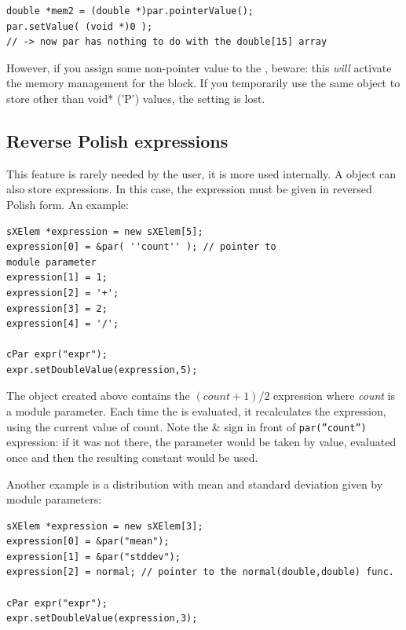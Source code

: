 \begin{verbatim}
double *mem2 = (double *)par.pointerValue();
par.setValue( (void *)0 );
// -> now par has nothing to do with the double[15] array
\end{verbatim}



However, if you assign some non-pointer value
to the , beware: this \textit{will} activate the memory
management for the block. If you temporarily use the same
 object to store other than void* ('P') values, the
 setting is lost.



\subsection{Reverse Polish expressions}

This feature is rarely needed by the user, it is more used internally.
A  object can also store
expressions. In this case, the expression must
be given in reversed Polish form. An
example:

\begin{verbatim}
sXElem *expression = new sXElem[5];
expression[0] = &par( ''count'' ); // pointer to
module parameter
expression[1] = 1;
expression[2] = '+';
expression[3] = 2;
expression[4] = '/';

cPar expr("expr");
expr.setDoubleValue(expression,5);
\end{verbatim}


The  object created above contains the $(count+1)/2$
expression where \textit{count} is a module parameter. Each time the
 is evaluated, it recalculates the expression, using the
current value of count. Note the \& sign in front of
\texttt{par(''count'')} expression: if it was not there, the parameter
would be taken by value, evaluated once and
then the resulting constant would be used.

Another example is a distribution with mean and
standard deviation given by module parameters:

\begin{verbatim}
sXElem *expression = new sXElem[3];
expression[0] = &par("mean");
expression[1] = &par("stddev");
expression[2] = normal; // pointer to the normal(double,double) func.

cPar expr("expr");
expr.setDoubleValue(expression,3);
\end{verbatim}


